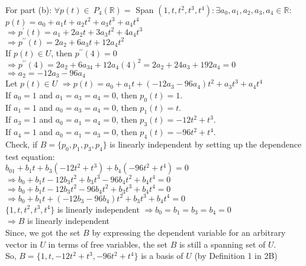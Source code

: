 \documentclass{article}
\begin{document}
\newpage
For part (b):
$\forall p(t) ∈\ P_4(\mathbb{R}) =$ Span $(1,t,t^2,t^3,t^4):$\enskip $\exists
a_0,a_1,a_2,a_3,a_4 \in \mathbb{R}:$\\
$p(t) = a_0+a_1t+a_2t^2+a_3t^3+a_4t^4$\\
$\Rightarrow p^\prime(t) = a_1+2a_2t+3a_3t^2+4a_4t^3$\\
$\Rightarrow p^{\prime\prime}(t) = 2a_2+6a_3t+12a_4t^2$\\
If $p(t) \in U$, then $p^{\prime\prime}(4)=0$\\
$\Rightarrow p^{\prime\prime}(4) = 2a_2+6a_34+12a_4(4)^2=
2a_2+24a_3+192a_4=0$\\
$\Rightarrow a_2=-12a_3-96a_4$\\
Let $p(t) \in U$ $\Rightarrow p(t) = a_0+a_1t +(-12a_3-96a_4)t^2+a_3t^3+a_4t^4$\\
If $a_0 = 1$ and $a_1 = a_3 = a_4 =0$, then $p_0(t) = 1$.\\
If $a_1 = 1$ and $a_0 = a_3 = a_4 =0$, then $p_1(t) = t$.\\
If $a_3 = 1$ and $a_0 = a_1 = a_4 =0$, then $p_3(t) = -12t^2+t^3$.\\
If $a_4 = 1$ and $a_0 = a_1 = a_3 =0$, then $p_4(t) = -96t^2+t^4$.\\
Check, if $B = \{p_0,p_1,p_3,p_4\}$ is linearly independent by setting
up the dependence test equation:\\
$b_01 + b_1t + b_3(-12t^2+t^3) +b_4(-96t^2+t^4) = 0$\\
$\Rightarrow b_0 + b_1t -12b_3t^2 + b_3t^3 -96b_4t^2 + b_4t^4= 0$\\
$\Rightarrow b_0 + b_1t -12b_3t^2 -96b_4t^2 + b_3t^3 + b_4t^4 = 0$\\
$\Rightarrow b_0 + b_1t +(-12b_3 -96b_4)t^2 +b_3t^3 + b_4t^4 = 0$\\
$\{1,t,t^2,t^3,t^4\}$ is linearly independent $\Rightarrow b_0 = b_1 =  b_3 = b_4=0$\\
$\Rightarrow B$ is linearly independent\\
Since, we got the set $B$ by expressing the dependent variable for an
arbitrary vector in $U$ in terms of free variables, the
set $B$ is still a spanning set of $U$.\\
So, $B=\{1,t,-12t^2+t^3,-96t^2+t^4\}$ is a basis of $U$ (by Definition 1 in 2B)\\
\end{document}
